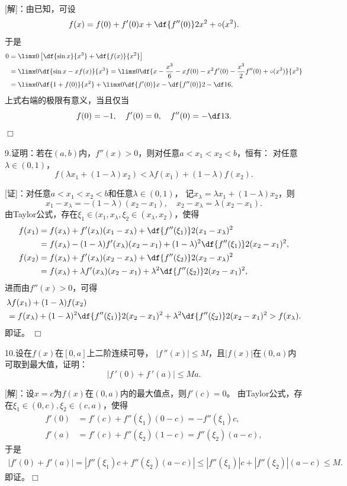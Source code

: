 [解]：由已知，可设
$$f(x)=f(0)+f'(0)x+\df{f''(0)}2x^2+\circ(x^2).$$
于是
\begin{align*}
	0&=\limx0\left[\df{\sin x}{x^3}+\df{f(x)}{x^2}\right]\\
	&=\limx0\df{\sin x-xf(x)}{x^3}
	=\limx0\df{x-\frac{x^3}6-xf(0)-x^2f'(0)-\frac{x^3}2f''(0)+\circ(x^3)}{x^3}\\
	&=\limx0\df{1+f(0)}{x^2}+\limx0\df{f'(0)}x-\df{f''(0)}2-\df16,
\end{align*}
上式右端的极限有意义，当且仅当
$$f(0)=-1,\quad f'(0)=0,\quad f''(0)=-\df13.$$
\hfill$\Box$

\bigskip

9.证明：若在$(a,b)$内，$f''(x)>0$，则对任意$a<x_1<x_2<b$，恒有：
对任意$\lambda\in(0,1)$，
$$f(\lambda x_1+(1-\lambda)x_2)<\lambda
f(x_1)+(1-\lambda)f(x_2).$$

[证]：对任意$a<x_1<x_2<b$和任意$\lambda\in(0,1)$，
记$x_{\lambda}=\lambda x_1+(1-\lambda)x_2$，则
$$x_1-x_{\lambda}=-(1-\lambda)(x_2-x_1),\quad
x_2-x_{\lambda}=\lambda(x_2-x_1).$$
由Taylor公式，存在$\xi_1\in(x_1,x_{\lambda},
\xi_2\in(x_{\lambda},x_2)$，使得
\begin{align*}
	f(x_1)&=f(x_{\lambda})+f'(x_{\lambda})(x_1-x_{\lambda})
	+\df{f''(\xi_1)}2(x_1-x_{\lambda})^2\\
	&=f(x_{\lambda})-(1-\lambda)f'(x_{\lambda})(x_2-x_1)
	+(1-\lambda)^2\df{f''(\xi_1)}2(x_2-x_1)^2,\\
	f(x_2)&=f(x_{\lambda})+f'(x_{\lambda})(x_2-x_{\lambda})
	+\df{f''(\xi_2)}2(x_2-x_{\lambda})^2\\
	&=f(x_{\lambda})+\lambda f'(x_{\lambda})(x_2-x_1)
	+\lambda^2\df{f''(\xi_2)}2(x_2-x_1)^2,
\end{align*}
进而由$f''(x)>0$，可得
\begin{align*}
	&\lambda f(x_1)+(1-\lambda)f(x_2)\\
	&=f(x_{\lambda})+(1-\lambda)^2\df{f''(\xi_1)}2(x_2-x_1)^2
	+\lambda^2\df{f''(\xi_2)}2(x_2-x_1)^2>f(x_{\lambda}).
\end{align*}
即证。
\hfill$\Box$

\bigskip

10.设在$f(x)$在$[0,a]$上二阶连续可导，
$|f\,''(x)|\leq M$，且$|f(x)|$在$(0,a)$内可取到最大值，证明：
$$|f\,'(0)+f\,'(a)|\leq Ma.$$	

[解]：设$x=c$为$f(x)$在$(0,a)$内的最大值点，则$f'(c)=0$。
由Taylor公式，存在$\xi_1\in(0,c),\xi_2\in(c,a)$，使得
\begin{align*}
	f'(0)&=f'(c)+f''(\xi_1)(0-c)=-f''(\xi_1)c,\\
	f'(a)&=f'(c)+f''(\xi_2)(1-c)=f''(\xi_2)(a-c),
\end{align*}
于是
\begin{align*}
	|f'(0)+f'(a)|=|f''(\xi_1)c+f''(\xi_2)(a-c)|
	\leq|f''(\xi_1)|c+|f''(\xi_2)|(a-c)\leq M.
\end{align*}
即证。\hfill$\Box$

